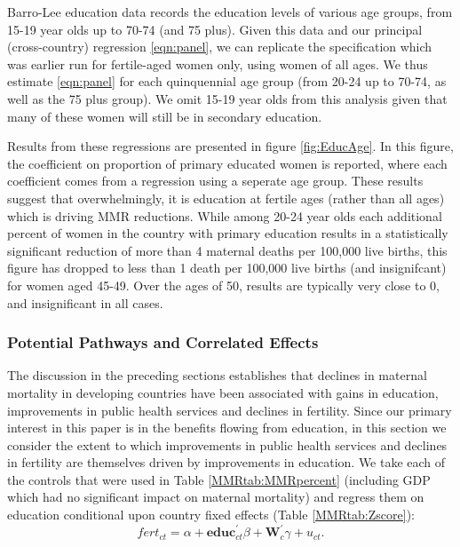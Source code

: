 \documentclass{article}[12pt,subeqn]
\begin{document}
\begin{spacing}{1.4}
Barro-Lee education data records the education levels of various age groups,
from 15-19 year olds up to 70-74 (and 75 plus).  Given this data and our
principal (cross-country) regression \ref{eqn:panel}, we can replicate the
specification which was earlier run for fertile-aged women only, using women of
all ages.  We thus estimate \ref{eqn:panel} for each quinquennial age group
(from 20-24 up to 70-74, as well as the 75 plus group).  We omit
15-19 year olds from this analysis given that many of these women will still
be in secondary education.

Results from these regressions are presented in figure \ref{fig:EducAge}. In
this figure, the coefficient on proportion of primary educated women is reported,
where each coefficient comes from a regression using a seperate age group.
These results suggest that overwhelmingly, it is education at fertile ages (rather
than all ages) which is driving MMR reductions.  While among 20-24 year olds
each additional percent of women in the country with primary education results in
a statistically significant reduction of more than 4 maternal deaths per 100,000
live births, this figure has dropped to less than 1 death per
100,000 live births (and insignifcant) for women aged 45-49.  Over the ages
of 50, results are typically very close to 0, and insignificant in all cases.


\subsubsection{Potential Pathways and Correlated Effects}
\label{ssscn:effects}
The discussion in the preceding sections establishes that declines in maternal 
mortality in developing countries have been associated with gains in education, 
improvements in public health services and declines in fertility. Since our 
primary interest in this paper is in the benefits flowing from education, in this 
section we consider the extent to which improvements in public health services and 
declines in fertility are themselves driven by improvements in education. We take 
each of the controls that were used in Table \ref{MMRtab:MMRpercent} (including 
GDP which had no significant impact on maternal mortality) and regress them on 
education conditional upon country fixed effects (Table \ref{MMRtab:Zscore}):
\begin{equation}
\label{eqn:Zscore}
  fert_{ct}=\alpha + \mathbf{educ}^\prime_{ct}\beta + \mathbf{W}^\prime_c\gamma 
  + u_{ct}.
\end{equation}


\end{spacing}
\end{document}
